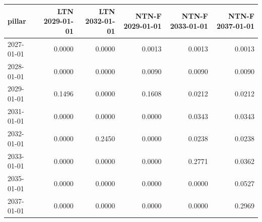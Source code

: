\begin{tabular}{lrrrrr}
\toprule
pillar & LTN 2029-01-01 & LTN 2032-01-01 & NTN-F 2029-01-01 & NTN-F 2033-01-01 & NTN-F 2037-01-01 \\
\midrule
2027-01-01 & 0.0000 & 0.0000 & 0.0013 & 0.0013 & 0.0013 \\
2028-01-01 & 0.0000 & 0.0000 & 0.0090 & 0.0090 & 0.0090 \\
2029-01-01 & 0.1496 & 0.0000 & 0.1608 & 0.0212 & 0.0212 \\
2031-01-01 & 0.0000 & 0.0000 & 0.0000 & 0.0343 & 0.0343 \\
2032-01-01 & 0.0000 & 0.2450 & 0.0000 & 0.0238 & 0.0238 \\
2033-01-01 & 0.0000 & 0.0000 & 0.0000 & 0.2771 & 0.0362 \\
2035-01-01 & 0.0000 & 0.0000 & 0.0000 & 0.0000 & 0.0527 \\
2037-01-01 & 0.0000 & 0.0000 & 0.0000 & 0.0000 & 0.2969 \\
\bottomrule
\end{tabular}
